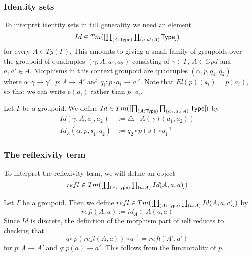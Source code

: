 \documentclass[handout,xcolor=dvipsnames]{beamer}
\renewcommand\type{\mathsf{Type}}
\begin{document}
\begin{frame}
  \frametitle{Identity sets}
To interpret identity sets in full generality we need an element
\begin{equation*}\textstyle
Id\in Tm([\prd{A:\type}{a,a':A}\type])
\end{equation*}
for every $A\in Ty(\Gamma)$. This amounts to giving a small family of groupoids
over the groupoid of quadruples $(\gamma,A,a_1,a_2)$ consisting of $\gamma\in\Gamma$,
$A\in Gpd$ and $a,a'\in A$. Morphisms in this context groupoid are quadruples
$(\alpha,p,q_1,q_2)$ where $\alpha:\gamma\to\gamma'$, $p:A\to A'$ and $q_i:p\cdot a_i
\to a_i'$. Note that $El(p)(a_i)=p(a_i)$, so that we can write $p(a_i)$ rather
than $p\cdot a_i$.

\begin{definition}
Let $\Gamma$ be a groupoid. We define $Id\in Tm([\prd{A:\type}{a_1,a_2:A}\type])$
by
\begin{align*}
Id(\gamma,A,a_1,a_2) & := \triangle(A(\gamma)(a_1,a_2))\\
Id_A(\alpha,p,q_1,q_2) & := q_2\circ p(s)\circ q_1^{-1}
\end{align*}
\end{definition}
\end{frame}

\begin{frame}
  \frametitle{The reflexivity term}
To interpret the reflexivity term, we will define an object
\begin{equation*}\textstyle
  refl\in Tm([\prd{A:\type}{a:A}Id(A,a,a)])
\end{equation*}

\begin{definition}
  Let $\Gamma$ be a groupoid. Then we define 
  $refl\in Tm([\prd{A:\type}{a:A}Id(A,a,a)])$ by 
  \begin{equation*}
    refl(A,a) := id_A\in A(a,a)
  \end{equation*}
  Since $Id$ is discrete, the definition of the morphism part of relf reduces
  to checking that
  \begin{equation*}
    q \circ p(refl(A,a))\circ q^{-1} = refl(A',a')
  \end{equation*}
  for $p:A\to A'$ and $q:p(a)\to a'$. This follows from the functoriality of $p$.
\end{definition}
\end{frame}
\end{document}
